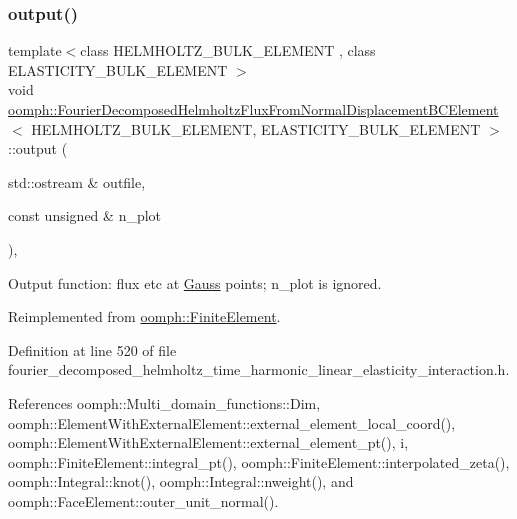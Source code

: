 \subsubsection{\texorpdfstring{output()}{output()}\hspace{0.1cm}{\footnotesize\ttfamily [2/4]}}
{\footnotesize\ttfamily template$<$class H\+E\+L\+M\+H\+O\+L\+T\+Z\+\_\+\+B\+U\+L\+K\+\_\+\+E\+L\+E\+M\+E\+NT , class E\+L\+A\+S\+T\+I\+C\+I\+T\+Y\+\_\+\+B\+U\+L\+K\+\_\+\+E\+L\+E\+M\+E\+NT $>$ \\
void \hyperlink{classoomph_1_1FourierDecomposedHelmholtzFluxFromNormalDisplacementBCElement}{oomph\+::\+Fourier\+Decomposed\+Helmholtz\+Flux\+From\+Normal\+Displacement\+B\+C\+Element}$<$ H\+E\+L\+M\+H\+O\+L\+T\+Z\+\_\+\+B\+U\+L\+K\+\_\+\+E\+L\+E\+M\+E\+NT, E\+L\+A\+S\+T\+I\+C\+I\+T\+Y\+\_\+\+B\+U\+L\+K\+\_\+\+E\+L\+E\+M\+E\+NT $>$\+::output (\begin{DoxyParamCaption}\item[{std\+::ostream \&}]{outfile,  }\item[{const unsigned \&}]{n\+\_\+plot }\end{DoxyParamCaption})\hspace{0.3cm}{\ttfamily [inline]}, {\ttfamily [virtual]}}



Output function\+: flux etc at \hyperlink{classoomph_1_1Gauss}{Gauss} points; n\+\_\+plot is ignored. 



Reimplemented from \hyperlink{classoomph_1_1FiniteElement_afa9d9b2670f999b43e6679c9dd28c457}{oomph\+::\+Finite\+Element}.



Definition at line 520 of file fourier\+\_\+decomposed\+\_\+helmholtz\+\_\+time\+\_\+harmonic\+\_\+linear\+\_\+elasticity\+\_\+interaction.\+h.



References oomph\+::\+Multi\+\_\+domain\+\_\+functions\+::\+Dim, oomph\+::\+Element\+With\+External\+Element\+::external\+\_\+element\+\_\+local\+\_\+coord(), oomph\+::\+Element\+With\+External\+Element\+::external\+\_\+element\+\_\+pt(), i, oomph\+::\+Finite\+Element\+::integral\+\_\+pt(), oomph\+::\+Finite\+Element\+::interpolated\+\_\+zeta(), oomph\+::\+Integral\+::knot(), oomph\+::\+Integral\+::nweight(), and oomph\+::\+Face\+Element\+::outer\+\_\+unit\+\_\+normal().

\mbox{\label{classoomph_1_1FourierDecomposedHelmholtzFluxFromNormalDisplacementBCElement_aab3531a5a9c6a1a1fb4d2e9051e22c7e}} 
